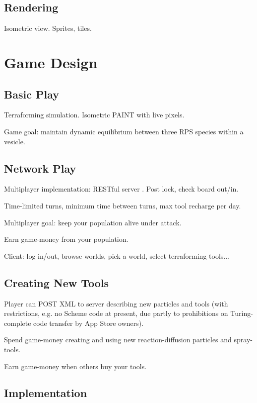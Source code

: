 \documentclass{acm_proc_article-sp}
\begin{document}
\subsection{Rendering}

Isometric view.
Sprites, tiles.

\section{Game Design}

\subsection{Basic Play}

Terraforming simulation.
Isometric PAINT with live pixels.

Game goal: maintain dynamic equilibrium between three RPS species within a vesicle.

\subsection{Network Play}

Multiplayer implementation: RESTful server \cite{rest}.
Post lock, check board out/in.

Time-limited turns, minimum time between turns, max tool recharge per day.

Multiplayer goal: keep your population alive under attack.

Earn game-money from your population.

Client: log in/out, browse worlds, pick a world, select terraforming tools...

\subsection{Creating New Tools}

Player can POST XML to server describing new particles and tools
(with restrictions, e.g. no Scheme code at present, due partly to prohibitions on Turing-complete code transfer by App Store owners).

Spend game-money creating and using new reaction-diffusion particles and spray-tools.

Earn game-money when others buy your tools.

\subsection{Implementation}
\end{document}
